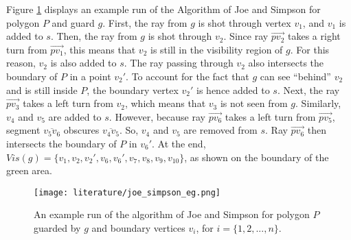 Figure \ref{fig:joe} displays an example run of the Algorithm of Joe and Simpson \cite{joe1987corrections} for polygon $P$ and guard $g$. First, the ray from $g$ is shot through vertex $v_1$, and $v_1$ is added to $s$. Then, the ray from $g$ is shot through $v_2$. Since ray $\vec{pv_2}$ takes a right turn from $\vec{pv_1}$, this means that $v_2$ is still in the visibility region of $g$. For this reason, $v_2$ is also added to $s$. The ray passing through $v_2$ also intersects the boundary of $P$ in a point $v_2'$. To account for the fact that $g$ can see ``behind'' $v_2$ and is still inside $P$, the boundary vertex $v_2'$ is hence added to $s$. Next, the ray $\vec{pv_3}$ takes a left turn from $v_2$, which means that $v_3$ is not seen from $g$. Similarly, $v_4$ and $v_5$ are added to $s$. However, because ray $\vec{pv_6}$ takes a left turn from $\vec{pv_5}$, segment $\overline{v_5v_6}$ obscures $\overline{v_4v_5}$. So, $v_4$ and $v_5$ are removed from $s$. Ray $\vec{pv_6}$ then intersects the boundary of $P$ in $v_6'$. At the end, $\mathit{Vis}(g) = \{v_1, v_2, v_2', v_6, v_6', v_7, v_8, v_9, v_{10}\}$, as shown on the boundary of the green area. 

\begin{figure}[h!]
	\centering
	\texttt{[image: literature/joe\_simpson\_eg.png]}
	\caption{An example run of the algorithm of Joe and Simpson \cite{joe1987corrections} for polygon $P$ guarded by $g$ and boundary vertices $v_i$, for $i = \{1, 2, ..., n\}$.}
	\label{fig:joe}
\end{figure}


